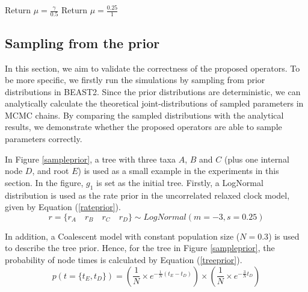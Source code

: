 \documentclass{bmcart}
\begin{document}
\begin{backmatter}
\begin{algorithm}
\begin{algorithmic}[1]
\STATE Return $\mu = \frac{\gamma }{{0.5}}$
\ENDIF
{}
\STATE Return $\mu = \frac{{0.25}}{1}$
\ENDIF

\end{algorithmic}
\end{algorithm}

\subsection*{Sampling from the prior}

In this section, we aim to validate the correctness of the proposed operators. To be more specific, we firstly run the simulations by sampling from prior distributions in BEAST2. Since the prior distributions are deterministic, we can analytically calculate the theoretical joint-distributions of sampled parameters in MCMC chains. By comparing the sampled distributions with the analytical results, we demonstrate whether the proposed operators are able to sample parameters correctly.

In Figure \ref{sampleprior}, a tree with three taxa $A$, $B$ and $C$ (plus one internal node $D$, and root $E$) is used as a small example in the experiments in this section. In the figure, $g_1$ is set as the initial tree. Firstly, a LogNormal distribution is used as the rate prior in the uncorrelated relaxed clock model, given by Equation (\ref{rateprior}).
\begin{equation}\label{rateprior}
r = \{{r_A}\quad{r_B}\quad{r_C}\quad{r_D}\} \sim LogNormal(m = -3, s = 0.25)
\end{equation}

In addition, a Coalescent model \cite{pybus2002genie} with constant population size ($N=0.3$) is used to describe the tree prior. Hence, for the tree in Figure \ref{sampleprior}, the probability of node times is calculated by Equation (\ref{treeprior}).
\begin{equation}\label{treeprior}
p(t=\{{t_E},{t_D}\}) = (\frac{1}{N} \times {e^{ - \frac{1}{N}({t_E} - {t_D})}}) \times (\frac{1}{N} \times {e^{ - \frac{3}{N}{t_D}}})
\end{equation}


\end{backmatter}
\end{document}
